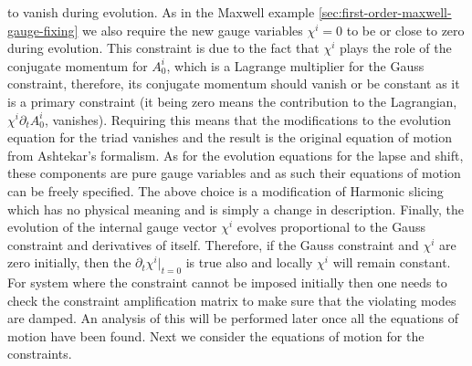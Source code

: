 \documentclass[10pt]{report}
\theoremstyle{definition}
\begin{document}
    to vanish during evolution. As in the Maxwell example \cref{sec:first-order-maxwell-gauge-fixing} we also require the new gauge variables $\chi^i = 0$ to be or close to zero during evolution. This constraint is due to the fact that $\chi^i$ plays the role of the conjugate momentum for $A^i_0$, which is a Lagrange multiplier for the Gauss constraint, therefore, its conjugate momentum should vanish or be constant as it is a primary constraint (it being zero means the contribution to the Lagrangian, $\chi^i \partial_t A^i_0$, vanishes). Requiring this means that the modifications to the evolution equation for the triad vanishes and the result is the original equation of motion from Ashtekar's formalism. As for the evolution equations for the lapse and shift, these components are pure gauge variables and as such their equations of motion can be freely specified. The above choice is a modification of Harmonic slicing which has no physical meaning and is simply a change in description. Finally, the evolution of the internal gauge vector $\chi^i$ evolves proportional to the Gauss constraint and derivatives of itself. Therefore, if the Gauss constraint and $\chi^i$ are zero initially, then the $\partial_t \chi^i |_{t=0}$ is true also and locally $\chi^i$ will remain constant. For system where the constraint cannot be imposed initially then one needs to check the constraint amplification matrix to make sure that the violating modes are damped. An analysis of this will be performed later once all the equations of motion have been found. Next we consider the equations of motion for the constraints.
\end{document}
